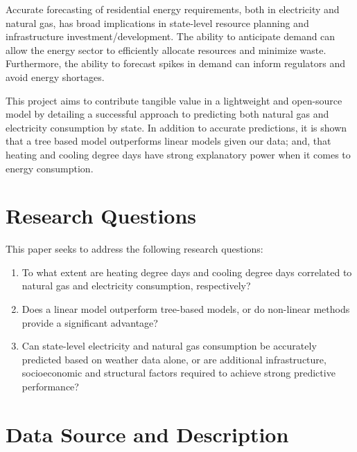 \documentclass[11pt,a4paper]{article}
\begin{document}
Accurate forecasting of residential energy requirements, both in electricity and natural gas, has broad implications in state-level resource planning and infrastructure investment/development. The ability to anticipate demand can allow the energy sector to efficiently allocate resources and minimize waste. Furthermore, the ability to forecast spikes in demand can inform regulators and avoid energy shortages. 

This project aims to contribute tangible value in a lightweight and open-source model by detailing a successful approach to predicting both natural gas and electricity consumption by state. In addition to accurate predictions, it is shown that a tree based model outperforms linear models given our data; and, that heating and cooling degree days have strong explanatory power when it comes to energy consumption.


\pagebreak
\section{Research Questions}
This paper seeks to address the following research questions:
\begin{enumerate}
\item To what extent are heating degree days and cooling degree days correlated to natural gas and electricity consumption, respectively?
\item Does a linear model outperform tree-based models, or do non-linear methods provide a significant advantage?
\item Can state-level electricity and natural gas consumption be accurately predicted based on weather data alone, or are additional infrastructure, socioeconomic and structural factors required to achieve strong predictive performance?
\end{enumerate}

\section{Data Source and Description}
\end{document}
